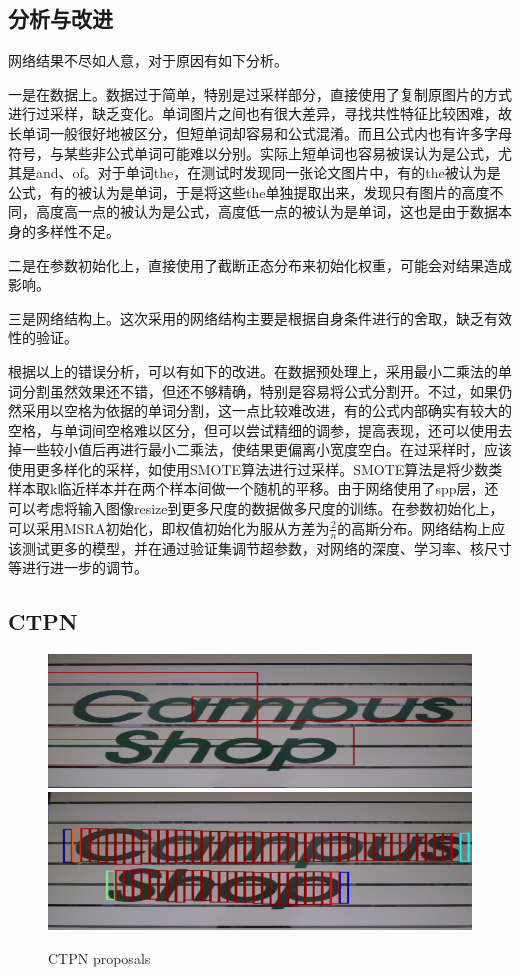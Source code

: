 \documentclass[12pt]{article}
\begin{document}
\subsection{分析与改进}
\noindent

网络结果不尽如人意，对于原因有如下分析。

一是在数据上。数据过于简单，特别是过采样部分，直接使用了复制原图片的方式进行过采样，缺乏变化。单词图片之间也有很大差异，寻找共性特征比较困难，故长单词一般很好地被区分，但短单词却容易和公式混淆。而且公式内也有许多字母符号，与某些非公式单词可能难以分别。实际上短单词也容易被误认为是公式，尤其是and、of。对于单词the，在测试时发现同一张论文图片中，有的the被认为是公式，有的被认为是单词，于是将这些the单独提取出来，发现只有图片的高度不同，高度高一点的被认为是公式，高度低一点的被认为是单词，这也是由于数据本身的多样性不足。

二是在参数初始化上，直接使用了截断正态分布来初始化权重，可能会对结果造成影响。

三是网络结构上。这次采用的网络结构主要是根据自身条件进行的舍取，缺乏有效性的验证。

根据以上的错误分析，可以有如下的改进。在数据预处理上，采用最小二乘法的单词分割虽然效果还不错，但还不够精确，特别是容易将公式分割开。不过，如果仍然采用以空格为依据的单词分割，这一点比较难改进，有的公式内部确实有较大的空格，与单词间空格难以区分，但可以尝试精细的调参，提高表现，还可以使用去掉一些较小值后再进行最小二乘法，使结果更偏离小宽度空白。在过采样时，应该使用更多样化的采样，如使用SMOTE算法进行过采样。SMOTE算法是将少数类样本取k临近样本并在两个样本间做一个随机的平移。由于网络使用了spp层，还可以考虑将输入图像resize到更多尺度的数据做多尺度的训练。在参数初始化上，可以采用MSRA初始化，即权值初始化为服从方差为$\frac 2 n$的高斯分布。\cite{msra}网络结构上应该测试更多的模型，并在通过验证集调节超参数，对网络的深度、学习率、核尺寸等进行进一步的调节。

\subsection{CTPN}
\noindent

\begin{figure}[hp]
    \centering
    \includegraphics[scale=0.5]{rpn.png}
    \includegraphics[scale=0.5]{ctpn.png}
    \caption{CTPN proposals}
    \label{fig:label}
\end{figure}
\end{document}
